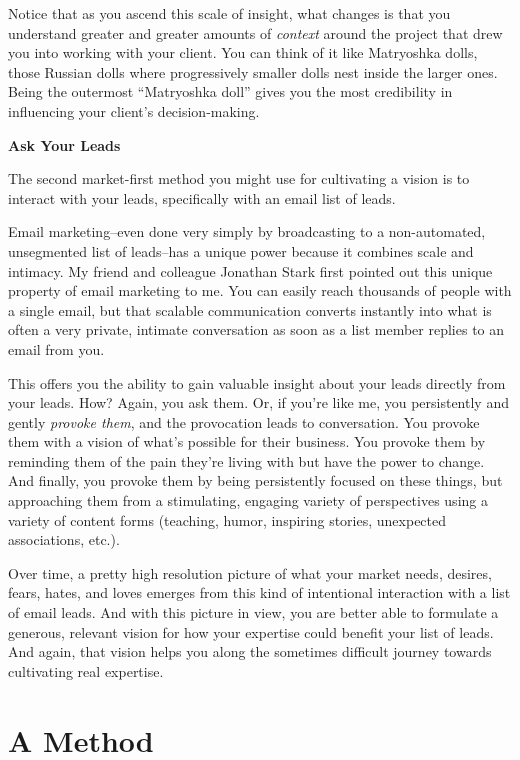 Notice that as you ascend this scale of insight, what changes is that you understand greater and greater amounts of \emph{context} around the project that drew you into working with your client. You can think of it like Matryoshka dolls, those Russian dolls where progressively smaller dolls nest inside the larger ones. Being the outermost ``Matryoshka doll'' gives you the most credibility in influencing your client's decision-making.

\textbf{Ask Your Leads}

The second market-first method you might use for cultivating a vision is to interact with your leads, specifically with an email list of leads.

Email marketing--even done very simply by broadcasting to a non-automated, unsegmented list of leads--has a unique power because it combines scale and intimacy. My friend and colleague Jonathan Stark first pointed out this unique property of email marketing to me. You can easily reach thousands of people with a single email, but that scalable communication converts instantly into what is often a very private, intimate conversation as soon as a list member replies to an email from you.

This offers you the ability to gain valuable insight about your leads directly from your leads. How? Again, you ask them. Or, if you're like me, you persistently and gently \emph{provoke them}, and the provocation leads to conversation. You provoke them with a vision of what's possible for their business. You provoke them by reminding them of the pain they're living with but have the power to change. And finally, you provoke them by being persistently focused on these things, but approaching them from a stimulating, engaging variety of perspectives using a variety of content forms (teaching, humor, inspiring stories, unexpected associations, etc.).

Over time, a pretty high resolution picture of what your market needs, desires, fears, hates, and loves emerges from this kind of intentional interaction with a list of email leads. And with this picture in view, you are better able to formulate a generous, relevant vision for how your expertise could benefit your list of leads. And again, that vision helps you along the sometimes difficult journey towards cultivating real expertise.

\section{A Method}

